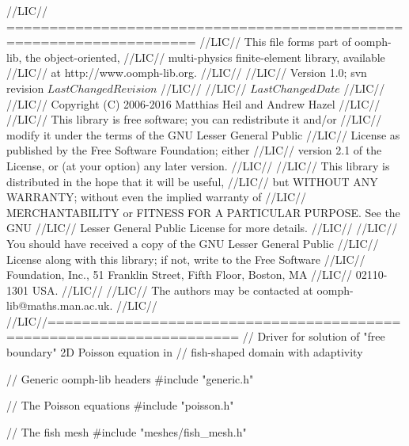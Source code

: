 \begin{DoxyCodeInclude}
\textcolor{comment}{//LIC// ====================================================================}
\textcolor{comment}{//LIC// This file forms part of oomph-lib, the object-oriented, }
\textcolor{comment}{//LIC// multi-physics finite-element library, available }
\textcolor{comment}{//LIC// at http://www.oomph-lib.org.}
\textcolor{comment}{//LIC// }
\textcolor{comment}{//LIC//    Version 1.0; svn revision $LastChangedRevision$}
\textcolor{comment}{//LIC//}
\textcolor{comment}{//LIC// $LastChangedDate$}
\textcolor{comment}{//LIC// }
\textcolor{comment}{//LIC// Copyright (C) 2006-2016 Matthias Heil and Andrew Hazel}
\textcolor{comment}{//LIC// }
\textcolor{comment}{//LIC// This library is free software; you can redistribute it and/or}
\textcolor{comment}{//LIC// modify it under the terms of the GNU Lesser General Public}
\textcolor{comment}{//LIC// License as published by the Free Software Foundation; either}
\textcolor{comment}{//LIC// version 2.1 of the License, or (at your option) any later version.}
\textcolor{comment}{//LIC// }
\textcolor{comment}{//LIC// This library is distributed in the hope that it will be useful,}
\textcolor{comment}{//LIC// but WITHOUT ANY WARRANTY; without even the implied warranty of}
\textcolor{comment}{//LIC// MERCHANTABILITY or FITNESS FOR A PARTICULAR PURPOSE.  See the GNU}
\textcolor{comment}{//LIC// Lesser General Public License for more details.}
\textcolor{comment}{//LIC// }
\textcolor{comment}{//LIC// You should have received a copy of the GNU Lesser General Public}
\textcolor{comment}{//LIC// License along with this library; if not, write to the Free Software}
\textcolor{comment}{//LIC// Foundation, Inc., 51 Franklin Street, Fifth Floor, Boston, MA}
\textcolor{comment}{//LIC// 02110-1301  USA.}
\textcolor{comment}{//LIC// }
\textcolor{comment}{//LIC// The authors may be contacted at oomph-lib@maths.man.ac.uk.}
\textcolor{comment}{//LIC// }
\textcolor{comment}{//LIC//====================================================================}
\textcolor{comment}{// Driver for solution of "free boundary" 2D Poisson equation in }
\textcolor{comment}{// fish-shaped domain with adaptivity}

 
\textcolor{comment}{// Generic oomph-lib headers}
\textcolor{preprocessor}{#include "generic.h"}

\textcolor{comment}{// The Poisson equations}
\textcolor{preprocessor}{#include "poisson.h"}

\textcolor{comment}{// The fish mesh }
\textcolor{preprocessor}{#include "meshes/fish\_mesh.h"}


\end{DoxyCodeInclude}
